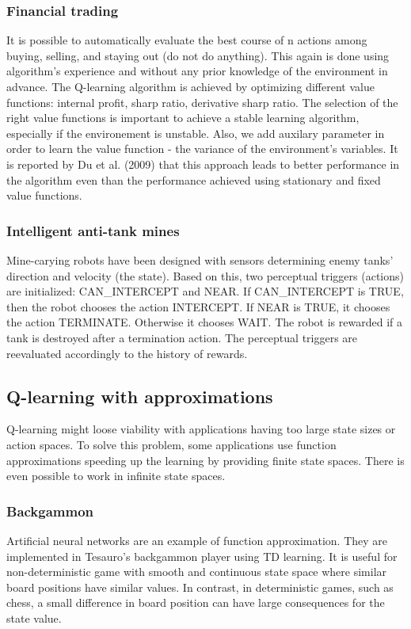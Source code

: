 \documentclass[fleqn]{article}
\begin{document}
\subsubsection{Financial trading}
It is possible to automatically evaluate the best course of n actions among buying, selling, and staying out (do not do anything). This again is done using algorithm's experience and without any prior knowledge of the environment in advance. The Q-learning algorithm is achieved by optimizing different value functions: internal profit, sharp  ratio,  derivative  sharp  ratio. The selection of the right value functions is important to achieve a stable learning algorithm, especially if the environement is unstable. Also, we add auxilary parameter in order to learn the value function - the variance of the environment's variables. It is reported by Du et al. (2009) that this approach leads to better performance in the algorithm  even than the performance achieved using stationary and fixed value functions. 

\subsubsection{Intelligent anti-tank mines}
Mine-carying robots have been designed with sensors determining enemy tanks' direction and velocity (the state). Based on this, two perceptual triggers (actions) are initialized: CAN\_INTERCEPT and NEAR. If CAN\_INTERCEPT is TRUE, then the robot chooses the action INTERCEPT. If NEAR is TRUE, it chooses the action TERMINATE. Otherwise it chooses WAIT. The robot is rewarded if a tank is destroyed after a termination action. The perceptual triggers are reevaluated accordingly to the history of rewards. 

\subsection{Q-learning with approximations}
Q-learning might loose viability with applications having too large state sizes or action spaces. To solve this problem, some applications use function approximations speeding up the learning by providing finite state spaces. There is even possible to work in infinite state spaces.

\subsubsection{Backgammon}
Artificial neural networks are an example of function approximation. They are implemented in Tesauro's backgammon player using TD learning. It is useful for non-deterministic game with smooth and continuous state space where similar board positions have similar values. In contrast, in deterministic games, such as chess, a small difference in board position can have large consequences for the state value. 
\end{document}
